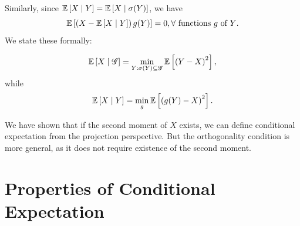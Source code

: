 Similarly, since $\mathbb{E}\left[X \mid Y\right]  = \mathbb{E}\left[X \mid \sigma(Y)\right] $, we have \[
	\mathbb{E}\left[\left( X - \mathbb{E}\left[X \mid Y\right]  \right)g(Y)\right] = 0, \forall\ \text{functions $g$ of $Y$}
.\] 
We state these formally:
\begin{proposition}
	\[\mathbb{E}\left[X \mid \mathscr{G}\right] = \min_{Y: \sigma(Y) \subseteq \mathscr{G}} \mathbb{E}\left[\left( Y-X \right)^2\right]
	,\] while \[
		\mathbb{E}\left[X \mid Y\right] = \min_{g} \mathbb{E}\left[\left( g(Y) - X \right)^2\right] 
	.\] 
\end{proposition}

\begin{remark}
We have shown that if the second moment of $X$ exists, we can define conditional expectation from the projection perspective. But the orthogonality condition is more general, as it does not require existence of the second moment.
\end{remark}

\section{Properties of Conditional Expectation}

